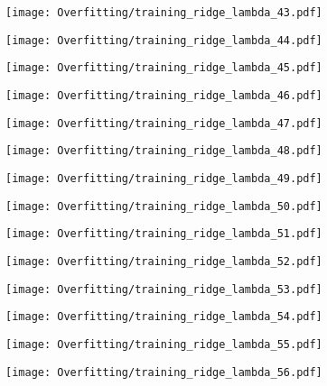 \documentclass[xcolor=pdftex,dvipsnames,table]{beamer}
\begin{document}
\frame
{
	\begin{center}
		\texttt{[image: Overfitting/training\_ridge\_lambda\_43.pdf]}
	\end{center}
}
\frame
{
	\begin{center}
		\texttt{[image: Overfitting/training\_ridge\_lambda\_44.pdf]}
	\end{center}
}
\frame
{
	\begin{center}
		\texttt{[image: Overfitting/training\_ridge\_lambda\_45.pdf]}
	\end{center}
}
\frame
{
	\begin{center}
		\texttt{[image: Overfitting/training\_ridge\_lambda\_46.pdf]}
	\end{center}
}
\frame
{
	\begin{center}
		\texttt{[image: Overfitting/training\_ridge\_lambda\_47.pdf]}
	\end{center}
}
\frame
{
	\begin{center}
		\texttt{[image: Overfitting/training\_ridge\_lambda\_48.pdf]}
	\end{center}
}
\frame
{
	\begin{center}
		\texttt{[image: Overfitting/training\_ridge\_lambda\_49.pdf]}
	\end{center}
}
\frame
{
	\begin{center}
		\texttt{[image: Overfitting/training\_ridge\_lambda\_50.pdf]}
	\end{center}
}
\frame
{
	\begin{center}
		\texttt{[image: Overfitting/training\_ridge\_lambda\_51.pdf]}
	\end{center}
}
\frame
{
	\begin{center}
		\texttt{[image: Overfitting/training\_ridge\_lambda\_52.pdf]}
	\end{center}
}
\frame
{
	\begin{center}
		\texttt{[image: Overfitting/training\_ridge\_lambda\_53.pdf]}
	\end{center}
}
\frame
{
	\begin{center}
		\texttt{[image: Overfitting/training\_ridge\_lambda\_54.pdf]}
	\end{center}
}
\frame
{
	\begin{center}
		\texttt{[image: Overfitting/training\_ridge\_lambda\_55.pdf]}
	\end{center}
}
\frame
{
	\begin{center}
		\texttt{[image: Overfitting/training\_ridge\_lambda\_56.pdf]}
	\end{center}
}
\end{document}

